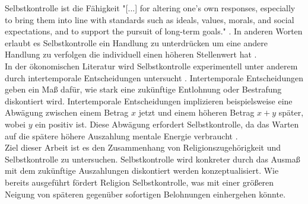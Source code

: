 \documentclass[11pt,a4paper]{article}
\begin{document}

Selbstkontrolle ist die Fähigkeit "[...] for altering one's own responses, especially to bring them into line with standards such as ideals, values, morals, and social expectations, and to support the pursuit of long-term goals." \parencite{baumeister2007strength}. In anderen Worten erlaubt es Selbstkontrolle ein Handlung zu unterdrücken um eine andere Handlung zu verfolgen die individuell einen höheren Stellenwert hat \parencite{mccullough2013religion}.\\

In der ökonomischen Literatur wird Selbstkontrolle experimentell unter anderem durch intertemporale Entscheidungen untersucht \parencite{thaler1991some}. Intertemporale Entscheidungen geben ein Maß dafür, wie stark eine zukünftige Entlohnung oder Bestrafung diskontiert wird. Intertemporale Entscheidungen implizieren beispielsweise eine Abwägung zwischen einem Betrag $x$ jetzt und einem höheren Betrag $x+y$ später, wobei $y$ ein positiv ist. Diese Abwägung erfordert Selbstkontrolle, da das Warten auf die spätere höhere Auszahlung mentale Energie verbraucht \parencite{thaler1991some}.\\

Ziel dieser Arbeit ist es den Zusammenhang von Religionszugehörigkeit und Selbstkontrolle zu untersuchen. Selbstkontrolle wird konkreter durch das Ausmaß mit dem zukünftige Auszahlungen diskontiert werden konzeptualisiert. Wie bereits ausgeführt fördert Religion Selbstkontrolle, was mit einer größeren Neigung von späteren gegenüber sofortigen Belohnungen einhergehen könnte. %
 
\end{document}

